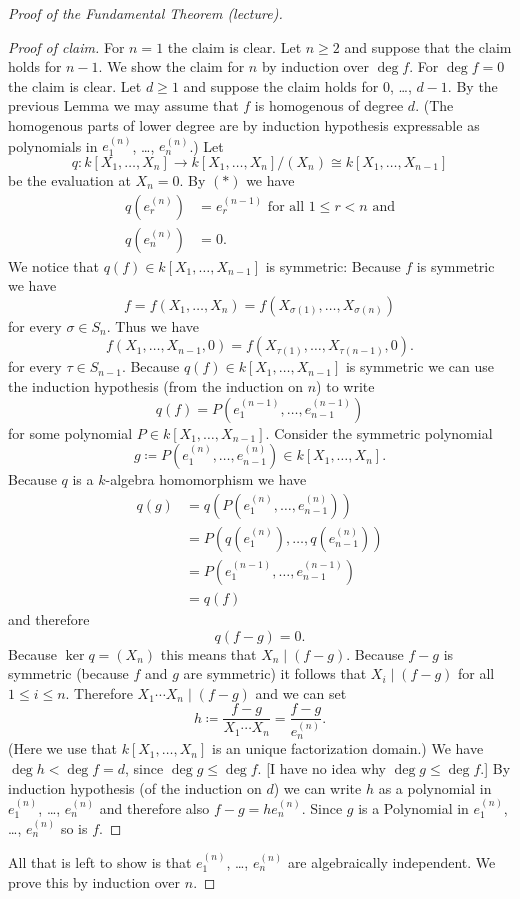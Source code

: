 \begin{proof}[Proof of the Fundamental Theorem (lecture)]
\begin{proof}[Proof of claim]
  For $n = 1$ the claim is clear. Let $n \geq 2$ and suppose that the claim holds for $n-1$. We show the claim for $n$ by induction over $\deg f$. For $\deg f = 0$ the claim is clear. Let $d \geq 1$ and suppose the claim holds for $0$, \dots, $d-1$. By the previous Lemma we may assume that $f$ is homogenous of degree $d$. (The homogenous parts of lower degree are by induction hypothesis expressable as polynomials in $e^{(n)}_1$, \dots, $e^{(n)}_n$.) Let
  \[
   q \colon k[X_1, \dotsc, X_n] \to k[X_1, \dotsc, X_n]/(X_n) \cong k[X_1, \dotsc, X_{n-1}]
  \]
  be the evaluation at $X_n = 0$. By $(\ast)$ we have
  \begin{align*}
   q\left( e^{(n)}_r \right) &= e^{(n-1)}_r \text{ for all } 1 \leq r < n \text{ and}\\
   q\left( e^{(n)}_n \right) &= 0.
  \end{align*}
  We notice that $q(f) \in k[X_1, \dotsc, X_{n-1}]$ is symmetric: Because $f$ is symmetric we have
  \[
   f = f(X_1, \dotsc, X_n) = f(X_{\sigma(1)}, \dotsc, X_{\sigma(n)})
  \]
  for every $\sigma \in S_n$. Thus we have
  \[
   f(X_1, \dotsc, X_{n-1}, 0) = f(X_{\tau(1)}, \dotsc, X_{\tau(n-1)}, 0).
  \]
  for every $\tau \in S_{n-1}$. Because $q(f) \in k[X_1, \dotsc, X_{n-1}]$ is symmetric we can use the induction hypothesis (from the induction on $n$) to write
  \[
   q(f) = P\left(e^{(n-1)}_1, \dotsc, e^{(n-1)}_{n-1}\right)
  \]
  for some polynomial $P \in k[X_1, \dotsc, X_{n-1}]$. Consider the symmetric polynomial
  \[
   g \coloneqq P\left(e^{(n)}_1, \dotsc, e^{(n)}_{n-1}\right) \in k[X_1, \dotsc, X_n].
  \]
  Because $q$ is a $k$-algebra homomorphism we have
  \begin{align*}
   q(g)
   &= q\left( P\left(e^{(n)}_1, \dotsc, e^{(n)}_{n-1}\right) \right) \\
   &= P\left( q\left(e^{(n)}_1\right), \dotsc, q\left(e^{(n)}_{n-1}\right) \right) \\
   &= P\left( e^{(n-1)}_1, \dotsc, e^{(n-1)}_{n-1} \right) \\
   &= q(f)
  \end{align*}
  and therefore
  \[
   q(f-g) = 0.
  \]
  Because $\ker q = (X_n)$ this means that $X_n \mid (f-g)$. Because $f-g$ is symmetric (because $f$ and $g$ are symmetric) it follows that $X_i \mid (f-g)$ for all $1 \leq i \leq n$. Therefore $X_1 \dotsm X_n \mid (f-g)$ and we can set
  \[
   h \coloneqq \frac{f-g}{X_1 \dotsm X_n} = \frac{f-g}{e^{(n)}_n}.
  \]
  (Here we use that $k[X_1, \dotsc, X_n]$ is an unique factorization domain.) We have $\deg h < \deg f = d$, since $\deg g \leq \deg f$. [I have no idea why $\deg g \leq \deg f$.] By induction hypothesis (of the induction on $d$) we can write $h$ as a polynomial in $e^{(n)}_1$, \dots, $e^{(n)}_n$ and therefore also $f-g = h e^{(n)}_n$. Since $g$ is a Polynomial in $e^{(n)}_1$, \dots, $e^{(n)}_n$ so is $f$.
 \end{proof}
  All that is left to show is that $e^{(n)}_1$, \dots, $e^{(n)}_n$ are algebraically independent. We prove this by induction over $n$.
  

\end{proof}
